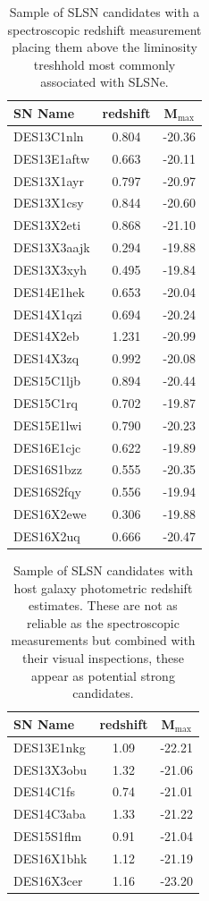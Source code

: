 \begin{table}
  \caption{Sample of SLSN candidates with a spectroscopic redshift measurement placing them above the liminosity treshhold most commonly associated with SLSNe.}
  \label{tab:SLSNwithSpecZ}
  \centering
  \begin{tabular}{|l|c|c|}
  \hline
  SN Name & redshift & M$_{\mathrm{max}}$ \\
  \hline
  DES13C1nln & 0.804 & -20.36 \\
  DES13E1aftw & 0.663 & -20.11 \\
  DES13X1ayr & 0.797 & -20.97 \\
  DES13X1csy & 0.844 & -20.60 \\
  DES13X2eti & 0.868 & -21.10 \\
  DES13X3aajk & 0.294 & -19.88 \\
  DES13X3xyh & 0.495 & -19.84 \\
  DES14E1hek & 0.653 & -20.04 \\
  DES14X1qzi & 0.694 & -20.24 \\
  DES14X2eb & 1.231 & -20.99 \\
  DES14X3zq & 0.992 & -20.08 \\
  DES15C1ljb & 0.894 & -20.44 \\
  DES15C1rq & 0.702 & -19.87 \\
  DES15E1lwi & 0.790 & -20.23 \\
  DES16E1cjc & 0.622 & -19.89 \\
  DES16S1bzz & 0.555 & -20.35 \\
  DES16S2fqy & 0.556 & -19.94 \\
  DES16X2ewe & 0.306 & -19.88 \\
  DES16X2uq & 0.666 & -20.47 \\
  \hline
  \end{tabular}
\end{table}

\begin{table}
  \caption{Sample of SLSN candidates with host galaxy photometric redshift estimates. These are not as reliable as the spectroscopic measurements but combined with their visual inspections, these appear as potential strong candidates.}
  \label{tab:SLSNwithPhotZ}
  \centering
  \begin{tabular}{|l|c|c|}
  \hline
  SN Name & redshift & M$_{\mathrm{max}}$ \\
  \hline
  DES13E1nkg & 1.09 & -22.21 \\
  DES13X3obu & 1.32 & -21.06 \\
  DES14C1fs & 0.74 & -21.01 \\
  DES14C3aba & 1.33 & -21.22 \\
  DES15S1flm & 0.91 & -21.04 \\
  DES16X1bhk & 1.12 & -21.19 \\
  DES16X3cer & 1.16 & -23.20 \\
  \hline
  \end{tabular}
\end{table}

